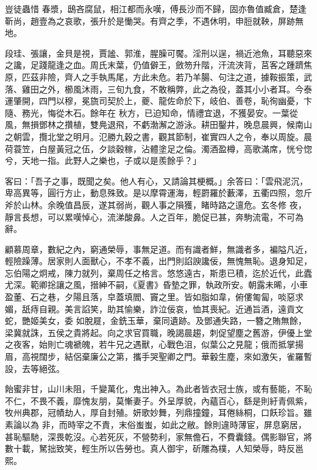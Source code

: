 \begin{pinyinscope}
 豈徒蟲惜
 春漿，鴟吝腐鼠，相江都而永嘆，傅長沙而不歸，固亦魯值臧倉，楚逢靳尚，趙壹為之哀歌，張升於是慟哭。有齊之季，不遇休明，申脰就鞅，屏跡無地。



 段珪、張讓，金貝是視，賈謐、郭淮，腥臊可饜。淫刑以逞，禍近池魚，耳聽惡來之讒，足踐龍逢之血。周氏末葉，仍值僻王，斂笏升階，汗流浹背，莒客之踵躋焦原，匹茲非險，齊人之手執馬尾，方此未危。若乃羊腸、句注之道，據鞍振策，武落、雞田之外，櫛風沐雨，三旬九食，不敢稱弊，此之為役，蓋其小小者耳。今泰運肇開，四門以穆，冕旒司契於上，夔、龍佐命於下，岐伯、善卷，恥徇幽憂，卞隨、務光，悔從木石。餘年在
 秋方，已迫知命，情禮宜退，不獲晏安。一葉從風，無損鄧林之攢植，雙鳧退飛，不虧渤澥之游泳。耕田鑿井，晚息晨興，候南山之朝雲，攬北堂之明月。氾勝九穀之書，觀其節制，崔實四人之令，奉以周旋。晨荷蓑笠，白屋黃冠之伍，夕談穀稼，沾體塗足之倫。濁酒盈樽，高歌滿席，恍兮惚兮，天地一指。此野人之樂也，子或以是羨餘乎？」



 客曰：「吾子之事，既聞之矣。他人有心，又請論其梗概。」余答曰：「雲飛泥沉，卑高異等，圓行方止，動息殊致。是以摩霄運海，輕罻羅於藪澤，五衢四照，忽斤斧於山林。余晚值昌辰，遂其弱尚，觀人事之隕獲，睹時路之邅危。玄冬修
 夜，靜言長想，可以累嘆悼心，流涕酸鼻。人之百年，脆促已甚，奔駒流電，不可為辭。



 顧慕周章，數紀之內，窮通榮辱，事無足道。而有識者鮮，無識者多，褊隘凡近，輕險躁薄。居家則人面獸心，不孝不義，出門則諂諛讒佞，無愧無恥。退身知足，忘伯陽之炯戒，陳力就列，棄周任之格言。悠悠遠古，斯患已積，迄於近代，此蠹尤深。範卿捴讓之風，搢紳不嗣，《夏書》昏墊之罪，執政所安。朝露未晞，小車盈董、石之巷，夕陽且落，皁蓋填閻、竇之里。皆如脂如韋，俯僂匍匐，啖惡求媚，舐痔自親。美言諂笑，助其愉樂，詐泣佞哀，恤其喪紀。近通旨酒，遠貢文蛇，艷姬美女，委
 如脫屣，金銑玉華，棄同遺跡。及鄧通失路，一簪之賄無餘，梁冀就誅，五侯之貴將起。向之求官買職，晚謁晨趨，刺促望塵之舊游，伊優上堂之夜客，始則亡魂褫魄，若牛兄之遇獸，心戰色沮，似葉公之見龍；俄而抵掌揚眉，高視闊步，結侶棄廉公之第，攜手哭聖卿之門。華轂生塵，來如激矢，雀羅暫設，去等絕弦。



 飴蜜非甘，山川未阻，千變萬化，鬼出神入。為此者皆衣冠士族，或有藝能，不恥不仁，不畏不義，靡愧友朋，莫慚妻子。外呈厚貌，內蘊百心，繇是則紆青佩紫，牧州典郡，冠幘劫人，厚自封殖。妍歌妙舞，列鼎撞鐘，耳倦絲桐，口飫珍旨。雖素論以為
 非，而時宰之不責，末俗蚩蚩，如此之敝。餘則違時薄宦，屏息窮居，甚恥驅馳，深畏乾沒。心若死灰，不營勢利，家無儋石，不費囊錢。偶影聯官，將數十載，駑拙致笑，輕生所以告勞也。真人御宇，斫雕為樸，人知榮辱，時反邕熙。




\end{pinyinscope}
